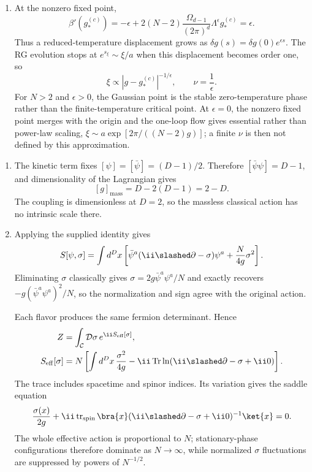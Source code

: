 \begin{enumerate}
\begin{enumerate}
    \item[(f)] At the nonzero fixed point,
    \[
      \beta'(g_*^{(c)})=-\epsilon
        +2(N-2)\frac{\Omega_{d-1}}{(2\pi)^d}
          \Lambda^\epsilon g_*^{(c)}
      =\epsilon.
    \]
    Thus a reduced-temperature displacement grows as
    \(\delta g(s)=\delta g(0)e^{\epsilon s}\).  The RG evolution stops
    at \(e^{s_\xi}\sim\xi/a\) when this displacement becomes order one,
    so
    \[
      \boxed{\xi\propto|g-g_*^{(c)}|^{-1/\epsilon},
      \qquad \nu=\frac{1}{\epsilon}.}
    \]
    For \(N>2\) and \(\epsilon>0\), the Gaussian point is the stable
    zero-temperature phase rather than the finite-temperature critical
    point.  At \(\epsilon=0\), the nonzero fixed point merges with the
    origin and the one-loop flow gives essential rather than power-law
    scaling,
    \(\xi\sim a\exp[2\pi/((N-2)g)]\); a finite \(\nu\) is then not
    defined by this approximation.
  \end{enumerate}

  \begin{enumerate}
    \item[(a)] The kinetic term fixes
    \([\psi]=[\bar\psi]=(D-1)/2\).  Therefore
    \([\bar\psi\psi]=D-1\), and dimensionality of the Lagrangian gives
    \[
      \boxed{[g]_{\mathrm{mass}}=D-2(D-1)=2-D.}
    \]
    The coupling is dimensionless at \(D=2\), so the massless classical
    action has no intrinsic scale there.

    \item[(b)] Applying the supplied identity gives
    \[
      S[\psi,\sigma]=\int d^Dx\left[
        \bar\psi^a(\ii\slashed\partial-\sigma)\psi^a
        +\frac{N}{4g}\sigma^2
      \right].
    \]
    Eliminating \(\sigma\) classically gives
    \(\sigma=2g\bar\psi^a\psi^a/N\) and exactly recovers
    \(-g(\bar\psi^a\psi^a)^2/N\), so the normalization and sign agree with
    the original action.

    Each flavor produces the same fermion determinant.  Hence
    \[
      \begin{aligned}
        Z&=\int_{\mathcal C}\mathcal D\sigma\,
          e^{\ii S_{\mathrm{eff}}[\sigma]},\\
        S_{\mathrm{eff}}[\sigma]
        &=N\left[
          \int d^Dx\,\frac{\sigma^2}{4g}
          -\ii\operatorname{Tr}\ln
            (\ii\slashed\partial-\sigma+\ii0)
        \right].
      \end{aligned}
    \]
    The trace includes spacetime and spinor indices.  Its variation gives
    the saddle equation
    \[
      \frac{\sigma(x)}{2g}
      +\ii\operatorname{tr}_{\mathrm{spin}}
        \bra{x}(\ii\slashed\partial-\sigma+\ii0)^{-1}\ket{x}=0.
    \]
    The whole effective action is proportional to \(N\); stationary-phase
    configurations therefore dominate as \(N\to\infty\), while normalized
    \(\sigma\) fluctuations are suppressed by powers of \(N^{-1/2}\).


\end{enumerate}
\end{enumerate}

